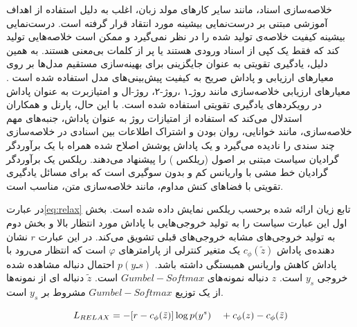 خلاصه‌سازی اسناد، مانند سایر کارهای مولد زبان،  اغلب به دلیل استفاده از اهداف آموزشی مبتنی بر  درست‌نمایی بیشینه
مورد انتقاد قرار گرفته است.
درست‌نمایی بیشینه کیفیت خلاصه‌ی تولید شده را در نظر نمی‌گیرد و ممکن است خلاصه‌هایی تولید کند که فقط یک کپی از اسناد ورودی هستند یا پر از کلمات بی‌معنی هستند. به همین دلیل، یادگیری تقویتی به عنوان جایگزینی برای بهینه‌سازی مستقیم مدل‌ها بر روی معیارهای ارزیابی و پاداش صریح به کیفیت پیش‌بینی‌های مدل استفاده شده است	\cite{Parnell2022AMC}. 
معیارهای ارزیابی خلاصه‌سازی مانند روژـ۱
،روژ-۲،
روژ-‌ال
و امتیازبرت
به عنوان پاداش در رویکردهای یادگیری تقویتی استفاده شده است. با این حال، پارنل و همکاران  استدلال می‌کند که استفاده از امتیازات روژ به عنوان پاداش، جنبه‌های مهم خلاصه‌سازی، مانند خوانایی، روان بودن و اشتراک اطلاعات بین اسنادی در خلاصه‌سازی چند سندی را نادیده می‌گیرد و یک پاداش پوشش اصلاح شده همراه با یک برآوردگر گرادیان سیاست مبتنی بر اصول (ریلکس )	 
را پیشنهاد می‌دهند\cite{Parnell2022AMC, ALOMARI}.
ریلکس یک برآوردگر گرادیان خط مشی
با واریانس کم و بدون سوگیری
است که برای مسائل یادگیری تقویتی با فضاهای کنش مداوم، مانند خلاصه‌سازی متن، مناسب است\cite{Grathwohl2017BackpropagationTT}.

در عبارت\ref {eq:relax} تابع زیان ارائه شده برحسب ریلکس نمایش داده شده است.
بخش اول این عبارت سیاست را به تولید خروجی‌هایی با پاداش مورد انتظار بالا و بخش دوم به تولید خروجی‌‌های مشابه خروجی‌های قبلی 
تشویق می‌کند.
در این عبارت
$ r $
نشان دهنده‌ی پاداش 
$  c_\phi(\tilde{z}) $
یک متغیر کنترلی از پارامترهای $ φ $ است که انتظار می‌رود با پاداش کاهش واریانس همبستگی داشته باشد.
$  p(yـs) $ 
احتمال دنباله مشاهده شده خروجی $ y_s $ است.
$ z $
دنباله نمونه‌های $Gumbel-Softmax  $ است.
$ \tilde{z} $
دنباله ای از نمونه‌ها از یک توزیع $ Gumbel-Softmax $ مشروط بر $ y_s $ است.


\begin{equation}
	\label{eq:relax}
	L_\text{$ RELAX $} = -[r - c_\phi(\tilde{z})]   \log p(y^{s}) \quad + c_\phi(z) - c_\phi(\tilde{z})
\end{equation}


